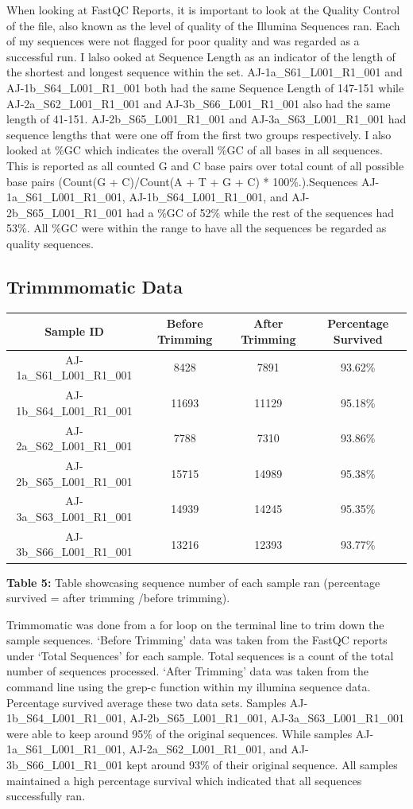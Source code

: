 \documentclass[]{article}
\begin{document}
When looking at FastQC Reports, it is important to look at the Quality
Control of the file, also known as the level of quality of the Illumina
Sequences ran. Each of my sequences were not flagged for poor quality
and was regarded as a successful run. I lalso ooked at Sequence Length
as an indicator of the length of the shortest and longest sequence
within the set. AJ-1a\_S61\_L001\_R1\_001 and AJ-1b\_S64\_L001\_R1\_001
both had the same Sequence Length of 147-151 while
AJ-2a\_S62\_L001\_R1\_001 and AJ-3b\_S66\_L001\_R1\_001 also had the
same length of 41-151. AJ-2b\_S65\_L001\_R1\_001 and
AJ-3a\_S63\_L001\_R1\_001 had sequence lengths that were one off from
the first two groups respectively. I also looked at \%GC which indicates
the overall \%GC of all bases in all sequences. This is reported as all
counted G and C base pairs over total count of all possible base pairs
(Count(G + C)/Count(A + T + G + C) * 100\%.).Sequences
AJ-1a\_S61\_L001\_R1\_001, AJ-1b\_S64\_L001\_R1\_001, and
AJ-2b\_S65\_L001\_R1\_001 had a \%GC of 52\% while the rest of the
sequences had 53\%. All \%GC were within the range to have all the
sequences be regarded as quality sequences.

\hypertarget{trimmmomatic-data}{%
\subsection{Trimmmomatic Data}\label{trimmmomatic-data}}

\begin{longtable}[]{@{}cccc@{}}
\toprule
Sample ID & Before Trimming & After Trimming & Percentage
Survived\tabularnewline
\midrule
\endhead
AJ-1a\_S61\_L001\_R1\_001 & 8428 & 7891 & 93.62\%\tabularnewline
AJ-1b\_S64\_L001\_R1\_001 & 11693 & 11129 & 95.18\%\tabularnewline
AJ-2a\_S62\_L001\_R1\_001 & 7788 & 7310 & 93.86\%\tabularnewline
AJ-2b\_S65\_L001\_R1\_001 & 15715 & 14989 & 95.38\%\tabularnewline
AJ-3a\_S63\_L001\_R1\_001 & 14939 & 14245 & 95.35\%\tabularnewline
AJ-3b\_S66\_L001\_R1\_001 & 13216 & 12393 & 93.77\%\tabularnewline
\bottomrule
\end{longtable}

\textbf{Table 5:} Table showcasing sequence number of each sample ran
(percentage survived = after trimming /before trimming).

Trimmomatic was done from a for loop on the terminal line to trim down
the sample sequences. `Before Trimming' data was taken from the FastQC
reports under `Total Sequences' for each sample. Total sequences is a
count of the total number of sequences processed. `After Trimming' data
was taken from the command line using the grep-c function within my
illumina sequence data. Percentage survived average these two data sets.
Samples AJ-1b\_S64\_L001\_R1\_001, AJ-2b\_S65\_L001\_R1\_001,
AJ-3a\_S63\_L001\_R1\_001 were able to keep around 95\% of the original
sequences. While samples AJ-1a\_S61\_L001\_R1\_001,
AJ-2a\_S62\_L001\_R1\_001, and AJ-3b\_S66\_L001\_R1\_001 kept around
93\% of their original sequence. All samples maintained a high
percentage survival which indicated that all sequences successfully ran.
\end{document}
